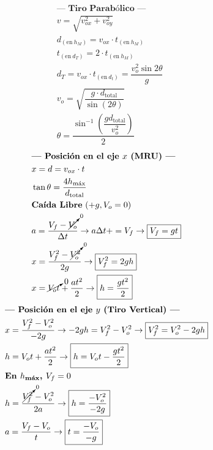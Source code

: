 \documentclass{article}
\begin{document}
\begin{vwcol}[widths={0.2,0.1,0.2,0.3}, sep=.5cm, justify=flush,indent=1em]
    \begin{align*}
    &\textbf{--- Tiro Parabólico ---}\\
    &v = \sqrt{v_{ox}^2 + v_{oy}^2}\\
    &d_{(\text{en}\ h_M)} = v_{ox} \cdot t_{(\text{en}\ h_M)}\\
    &t_{(\text{en}\ d_T)} = 2 \cdot t_{(\text{en}\ h_M)}\\
    &d_{T} = v_{ox} \cdot t_{(\text{en}\ d_t)} = \dfrac{v_o^2 \sin 2\theta}{g}\\
    &v_o = \sqrt{\dfrac{g \cdot d_{\text{total}}}{\sin(2\theta)}} \quad\\
    &\theta = \dfrac{\sin^{-1}\left(\dfrac{g d_{\text{total}}}{v_o^2}\right)}{2}
    \end{align*}
    \begin{align*}
    &\textbf{--- Posición en el eje $x$ (MRU) ---}\\    
    &x = d = v_{ox} \cdot t\\
    &\tan \theta = \dfrac{4 h_{\text{máx}}}{d_{\text{total}}}\\
    &\textbf{Caída Libre} \ (+g, V_o = 0)\\
    &a = \dfrac{V_f - \cancelto{0}{V_o}}{\Delta t} \rightarrow a\Delta t +  = V_f \rightarrow \boxed{V_f = g t}\\
    &x = \dfrac{V_f^2 - \cancelto{0}{V_o^2}}{2g} \rightarrow \boxed{V_f^2 = 2gh}\\
    &x = \cancelto{0}{V_o t} + \dfrac{a t^2}{2}  \rightarrow \boxed{h = \dfrac{g t^2}{2}}
    \end{align*}
    \begin{align*}
    &\textbf{--- Posición en el eje $y$ (Tiro Vertical) ---}\\    
    &x = \dfrac{V_f^2 - V_o^2}{-2g} \rightarrow -2gh = V_f^2 - V_o^2 \rightarrow \boxed{V_f^2 = V_o^2 - 2gh}\\
    &h = V_o t + \dfrac{a t^2}{2} \rightarrow \boxed{h = V_o t - \dfrac{g t^2}{2}}\\
    &\textbf{En $h_{\text{máx}}$, } V_f = 0\\
    &h = \dfrac{\cancelto{0}{V_f^2} - V_o^2}{2a} \rightarrow \boxed{h = \dfrac{-V_o^2}{-2g}}\\
    &a = \dfrac{V_f - V_o}{t} \rightarrow \boxed{t = \dfrac{-V_o}{-g}}
    \end{align*}
\end{vwcol}
\end{document}
